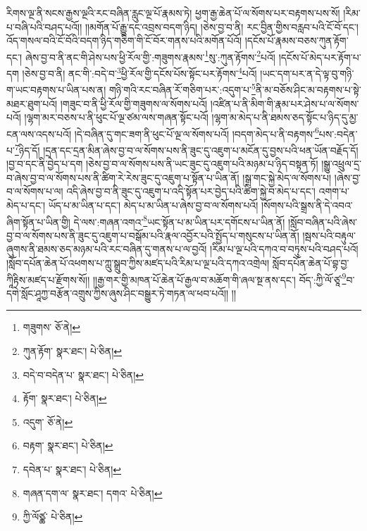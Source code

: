 རིགས་ལྔ་ནི་སངས་རྒྱས་ལྔའི་རང་བཞིན་རླུང་ལྔ་པོ་རྣམས་ཏེ། ཕྱག་རྒྱ་ཆེན་པོ་ལ་སོགས་པར་བརྟགས་པས་སོ། །རིམ་པ་བཞི་པའི་བཤད་པའོ།། །།མགོན་པོ་རྒྱུ་དང་འབྲས་བདག་ཉིད། །ཅེས་བྱ་བ་ནི། རང་བྱིན་གྱིས་བརླབ་པའི་ངོ་བོ་དང་། འོད་གསལ་བའི་ངོ་བོའི་བདག་ཉིད་གཅིག་གི་ངོ་བོར་གནས་པའི་མགོན་པོའོ། །དངོས་པོ་རྣམས་བཅས་ཀུན་རྟོག་དང་། ཞེས་བྱ་བ་ནི་ནང་གི་ཤེས་པས་ཕྱི་རོལ་གྱི་:གཟུགས་རྣམས་\footnote{གཟུགས་  ཅོ་ནེ། }སུ་:ཀུན་རྟོགས་\footnote{ཀུན་རྟོག་  སྣར་ཐང་།  པེ་ཅིན། }པའོ། །དངོས་པོ་མེད་པར་རྟོག་པ་དག །ཅེས་བྱ་བ་ནི། ནང་གི་:བདེ་བ་\footnote{བདེ་བ་བདེན་པ་  སྣར་ཐང་།  པེ་ཅིན། }ཕྱི་རོལ་གྱི་དངོས་པོས་སྟོང་པར་རྟོགས་\footnote{རྟོག་  སྣར་ཐང་།  པེ་ཅིན། }པའོ། །ཡང་དག་པར་ན་དེ་ལྟ་བུ་གཉི་ག་ཡང་བརྟགས་པ་ཡིན་པས་ན། གཉི་གའི་རང་བཞིན་རོ་གཅིག་པར་:འདུག་པ་\footnote{འདུག་  ཅོ་ནེ། }ནི་མ་བཅོས་ཤིང་མ་བརྟགས་པ་སྟེ་མཐར་ཐུག་པའོ། །གཟུང་བ་ནི་ཕྱི་རོལ་གྱི་གཟུགས་ལ་སོགས་པའོ། །འཛིན་པ་ནི་མིག་གི་རྣམ་པར་ཤེས་པ་ལ་སོགས་པའོ། །ལྷག་མར་བཅས་པ་ནི་ཕུང་པོ་ལྔ་ཙམ་ལས་གཞན་སྟོང་པའོ། །ལྷག་མ་མེད་པ་ནི་ཐམས་ཅད་སྟོང་པ་ཉིད་དུ་མྱ་ངན་ལས་འདས་པའོ། །དེ་བཞིན་དུ་གང་ཟག་ནི་ཕུང་པོ་ལྔ་ལ་སོགས་པའོ། །བདག་མེད་པ་ནི་བརྟགས་\footnote{བརྟག་  སྣར་ཐང་།  པེ་ཅིན། }པས་:བདེན་པ་\footnote{དབེན་པ་  སྣར་ཐང་།  པེ་ཅིན། }ཉིད་དོ། །དྲན་དང་དྲན་མིན་ཞེས་བྱ་བ་ལ་སོགས་པས་ནི་ཟུང་དུ་འཇུག་པ་མངོན་དུ་བྱས་པའི་ཕན་ཡོན་བརྗོད་དོ། །བྱ་བ་དང་ནི་བྱེད་པ་དག །ཅེས་བྱ་བ་ལ་སོགས་པས་ནི་ཡང་ཟུང་དུ་འཇུག་པའི་མཉམ་པ་ཉིད་བསྟན་ཏོ། །སྒྱུ་འཕྲུལ་དྲ་བ་ཞེས་བྱ་བ་ལ་སོགས་པས་ནི་ཚིག་རེ་རེས་ཟུང་དུ་འཇུག་པ་སྟོན་པ་ཡིན་ནོ། །སྒྲ་གང་སྐྱེ་མེད་ལ་སོགས་པ། །ཞེས་བྱ་བ་ལ་སོགས་པ་ལ། འདི་ཞེས་བྱ་བ་ནི་ཟུང་དུ་འཇུག་པ་འདི་སྟོན་པར་བྱེད་པའི་ཚིག་སྐྱེ་བ་མེད་པ་དང་། འགག་པ་མེད་པ་དང་། ཡོད་པ་མ་ཡིན་པ་དང་། མེད་པ་མ་ཡིན་པ་ཞེས་བྱ་བ་ལ་སོགས་པའོ། །སོགས་པའི་སྒྲས་ནི་དེ་འབའ་ཞིག་སྟོན་པ་ཡིན་གྱི། དེ་ལས་:གཞན་འགའ་\footnote{གཞན་དག་ལ་  སྣར་ཐང་། དགའ་  པེ་ཅིན། }ཡང་སྟོན་པ་མ་ཡིན་པར་དགོངས་པ་ཡིན་ནོ། །སློབ་བཞིན་པའི་ཞེས་བྱ་བ་ལ་སོགས་པས་ནི་ཟུང་དུ་འཇུག་པ་བསྒོམ་པའི་རྣལ་འབྱོར་པའི་སྤྱོད་པ་གསུངས་པ་ཡིན་ནོ། །སྦས་པའི་བརྟུལ་ཞུགས་ནི་ཐམས་ཅད་མཉམ་པའི་རང་བཞིན་དུ་གནས་པ་ལ་བྱའོ། །རིམ་པ་ལྔ་པའི་དཀའ་བ་བཏུས་པའི་བཤད་པའོ། །སློབ་དཔོན་ཆེན་པོ་འཕགས་པ་ཀླུ་སྒྲུབ་ཀྱིས་མཛད་པའི་རིམ་པ་ལྔ་པའི་དཀའ་འགྲེལ། སློབ་དཔོན་ཆེན་པོ་བྷ་བྱ་ཀཱིརྟིས་མཛད་པ་རྫོགས་སོ།། །།རྒྱ་གར་གྱི་མཁན་པོ་ཆེན་པོ་རྒྱལ་བ་མཆོག་གི་ཞལ་སྔ་ནས་དང་། བོད་:ཀྱི་ལོ་ཙཱ་\footnote{ཀྱི་ལོཙྪ་  པེ་ཅིན། }བ་དགེ་སློང་ཤཱཀྱ་བརྩོན་འགྲུས་ཀྱིས་ཞུས་ཤིང་བསྒྱུར་ཏེ་གཏན་ལ་ཕབ་པའོ།། །།